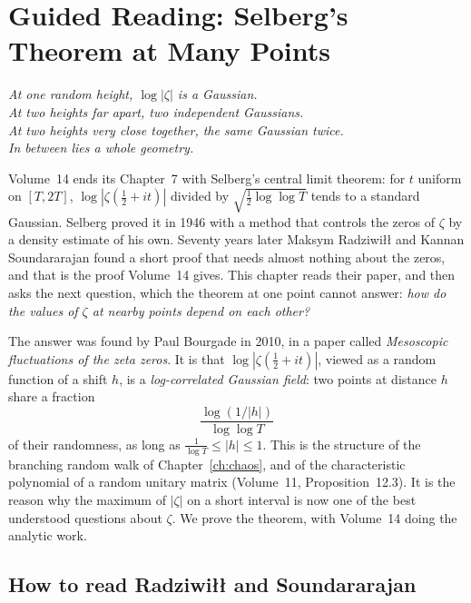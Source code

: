 \chapter{Guided Reading: Selberg's Theorem at Many Points}
\label{ch:selberg}

\begin{center}\itshape
At one random height, $\log|\zeta|$ is a Gaussian.\\
At two heights far apart, two independent Gaussians.\\
At two heights very close together, the same Gaussian twice.\\
In between lies a whole geometry.
\end{center}

Volume~14 ends its Chapter~7 with Selberg's central limit theorem: for $t$ uniform on $[T,2T]$, $\log|\zeta(\frac12+it)|$ divided by $\sqrt{\frac12\log\log T}$ tends to a standard Gaussian. Selberg proved it in 1946 with a method that controls the zeros of $\zeta$ by a density estimate of his own. Seventy years later Maksym Radziwi\l\l{} and Kannan Soundararajan found a short proof that needs almost nothing about the zeros, and that is the proof Volume~14 gives. This chapter reads their paper, and then asks the next question, which the theorem at one point cannot answer: \emph{how do the values of $\zeta$ at nearby points depend on each other?}

The answer was found by Paul Bourgade in 2010, in a paper called \emph{Mesoscopic fluctuations of the zeta zeros}. It is that $\log|\zeta(\frac12+it)|$, viewed as a random function of a shift $h$, is a \emph{log-correlated Gaussian field}: two points at distance $h$ share a fraction
\[
\frac{\log(1/|h|)}{\log\log T}
\]
of their randomness, as long as $\frac1{\log T}\le|h|\le1$. This is the structure of the branching random walk of Chapter~\ref{ch:chaos}, and of the characteristic polynomial of a random unitary matrix (Volume~11, Proposition~12.3). It is the reason why the maximum of $|\zeta|$ on a short interval is now one of the best understood questions about $\zeta$. We prove the theorem, with Volume~14 doing the analytic work.

\section{How to read Radziwi\l\l{} and Soundararajan}

